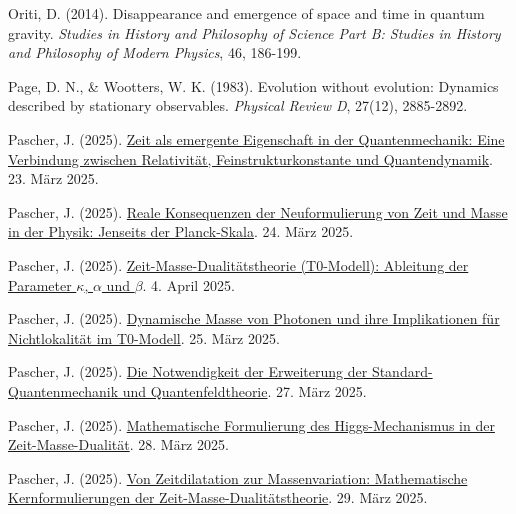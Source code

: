 \documentclass[a4paper,12pt]{article}
\begin{document}
\begin{thebibliography}{99}
		 Oriti, D. (2014). Disappearance and emergence of space and time in quantum gravity. \textit{Studies in History and Philosophy of Science Part B: Studies in History and Philosophy of Modern Physics}, 46, 186-199.
		
		 Page, D. N., \& Wootters, W. K. (1983). Evolution without evolution: Dynamics described by stationary observables. \textit{Physical Review D}, 27(12), 2885-2892.
		
		 Pascher, J. (2025). \href{https://github.com/jpascher/T0-Time-Mass-Duality/tree/main/2/pdf/Deutsch/ZeitEmergentQM.pdf}{Zeit als emergente Eigenschaft in der Quantenmechanik: Eine Verbindung zwischen Relativität, Feinstrukturkonstante und Quantendynamik}. 23. März 2025.
		
		 Pascher, J. (2025). \href{https://github.com/jpascher/T0-Time-Mass-Duality/tree/main/2/pdf/Deutsch/JenseitsPlanck.pdf}{Reale Konsequenzen der Neuformulierung von Zeit und Masse in der Physik: Jenseits der Planck-Skala}. 24. März 2025.
		
		 Pascher, J. (2025). \href{https://github.com/jpascher/T0-Time-Mass-Duality/tree/main/2/pdf/Deutsch/ZeitMasseT0Params.pdf}{Zeit-Masse-Dualitätstheorie (T0-Modell): Ableitung der Parameter \(\kappa\), \(\alpha\) und \(\beta\)}. 4. April 2025.
		
		 Pascher, J. (2025). \href{https://github.com/jpascher/T0-Time-Mass-Duality/tree/main/2/pdf/Deutsch/DynMassePhotonenNichtlokal.pdf}{Dynamische Masse von Photonen und ihre Implikationen für Nichtlokalität im T0-Modell}. 25. März 2025.
		
		 Pascher, J. (2025). \href{https://github.com/jpascher/T0-Time-Mass-Duality/tree/main/2/pdf/Deutsch/NotwendigkeitQMErweiterung.pdf}{Die Notwendigkeit der Erweiterung der Standard-Quantenmechanik und Quantenfeldtheorie}. 27. März 2025.
		
		 Pascher, J. (2025). \href{https://github.com/jpascher/T0-Time-Mass-Duality/tree/main/2/pdf/Deutsch/MathHiggsZeitMasse.pdf}{Mathematische Formulierung des Higgs-Mechanismus in der Zeit-Masse-Dualität}. 28. März 2025.
		
		 Pascher, J. (2025). \href{https://github.com/jpascher/T0-Time-Mass-Duality/tree/main/2/pdf/Deutsch/MathZeitMasseLagrange.pdf}{Von Zeitdilatation zur Massenvariation: Mathematische Kernformulierungen der Zeit-Masse-Dualitätstheorie}. 29. März 2025.
		

\end{thebibliography}
\end{document}
